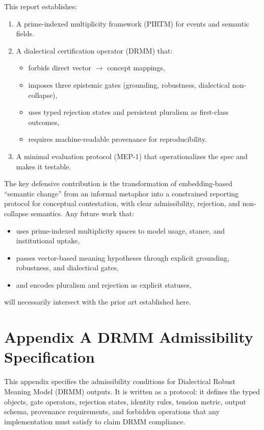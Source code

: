 \documentclass[11pt, a4paper]{article}
\begin{document}
This report establishes:
\begin{enumerate}[nosep]
  \item A prime-indexed multiplicity framework (PIRTM) for events and semantic fields.
  \item A dialectical certification operator (DRMM) that:
    \begin{itemize}[nosep]
      \item forbids direct vector $\to$ concept mappings,
      \item imposes three epistemic gates (grounding, robustness, dialectical non-collapse),
      \item uses typed rejection states and persistent pluralism as first-class outcomes,
      \item requires machine-readable provenance for reproducibility.
    \end{itemize}
  \item A minimal evaluation protocol (MEP-1) that operationalizes the spec and makes it testable.
\end{enumerate}

The key defensive contribution is the transformation of embedding-based ``semantic change'' from an informal metaphor into a constrained reporting protocol for conceptual contestation, with clear admissibility, rejection, and non-collapse semantics.
Any future work that:
\begin{itemize}[nosep]
  \item uses prime-indexed multiplicity spaces to model usage, stance, and institutional uptake,
  \item passes vector-based meaning hypotheses through explicit grounding, robustness, and dialectical gates,
  \item and encodes pluralism and rejection as explicit statuses,
\end{itemize}
will necessarily intersect with the prior art established here.
\newpage
\appendix
\section*{Appendix A \quad DRMM Admissibility Specification}

This appendix specifies the admissibility conditions for Dialectical Robust Meaning Model (DRMM) outputs. It is written as a protocol: it defines the typed objects, gate operators, rejection states, identity rules, tension metric, output schema, provenance requirements, and forbidden operations that any implementation must satisfy to claim DRMM compliance.
\end{document}
